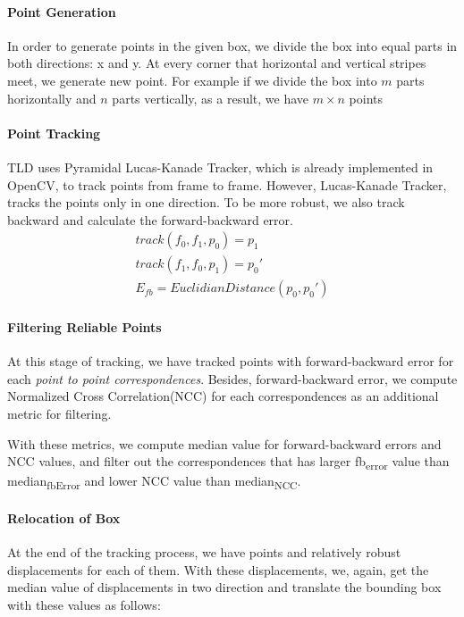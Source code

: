 \documentclass{report}
\begin{document}
        \paragraph{Point Generation}
            In order to generate points in the given box, we divide the box into equal
            parts in both directions: x and y. At every corner that horizontal and vertical stripes meet, we generate
            new point. For example if we divide the box into $m$ parts horizontally and $n$ parts vertically, as a result,
            we have $m \times n$ points
        \paragraph{Point Tracking}
            TLD uses Pyramidal Lucas-Kanade Tracker, which is already implemented in OpenCV, to track points from frame
            to frame. However, Lucas-Kanade Tracker, tracks the points only in one direction. To be more robust,
            we also track backward and calculate the forward-backward error.
            \begin{gather}
                track(f_{0}, f_{1}, p_{0}) = p_{1} \\
                track(f_{1}, f_{0}, p_{1}) = p_{0}' \\
                E_{fb} = EuclidianDistance(p_{0}, p_{0}')
            \end{gather}
        \paragraph{Filtering Reliable Points}
            At this stage of tracking, we have tracked points with forward-backward error
            for each \textit{point to point correspondences}. Besides, forward-backward error, we compute
            Normalized Cross Correlation(NCC) for each correspondences as an additional metric for filtering.

            With these metrics, we compute median value for forward-backward errors and NCC values, and filter out
            the correspondences that has larger fb\textsubscript{error} value than median\textsubscript{fbError} and
            lower NCC value than median\textsubscript{NCC}.

        \paragraph{Relocation of Box}
            At the end of the tracking process, we have points and relatively robust displacements for each of them.
            With these displacements, we, again, get the median value of displacements in two direction and translate
            the bounding box with these values as follows:
\end{document}
